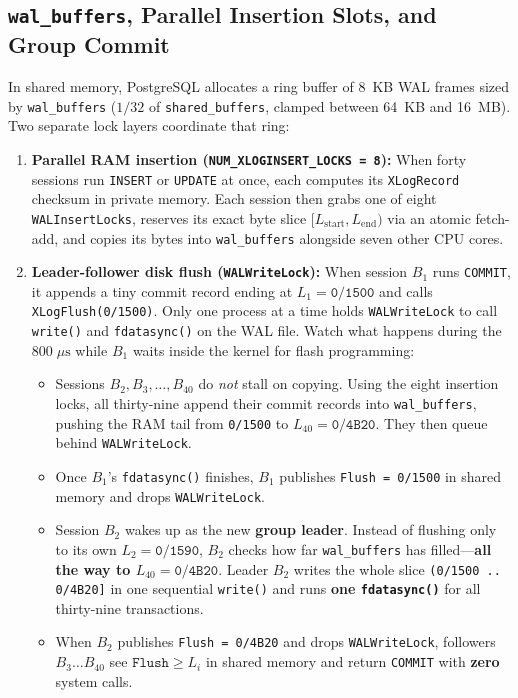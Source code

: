 \subsection{\texttt{wal\_buffers}, Parallel Insertion Slots, and Group Commit}

In shared memory, PostgreSQL allocates a ring buffer of 8~KB WAL frames sized by \texttt{wal\_buffers} ($1/32$ of \texttt{shared\_buffers}, clamped between 64~KB and 16~MB). Two separate lock layers coordinate that ring:

\begin{enumerate}
  \item \textbf{Parallel RAM insertion (\texttt{NUM\_XLOGINSERT\_LOCKS = 8}):} When forty sessions run \texttt{INSERT} or \texttt{UPDATE} at once, each computes its \texttt{XLogRecord} checksum in private memory. Each session then grabs one of eight \texttt{WALInsertLocks}, reserves its exact byte slice $[L_{\text{start}}, L_{\text{end}})$ via an atomic fetch-add, and copies its bytes into \texttt{wal\_buffers} alongside seven other CPU cores.
  \item \textbf{Leader-follower disk flush (\texttt{WALWriteLock}):} When session $B_1$ runs \texttt{COMMIT}, it appends a tiny commit record ending at $L_1 = \texttt{0/1500}$ and calls \texttt{XLogFlush(0/1500)}. Only one process at a time holds \texttt{WALWriteLock} to call \texttt{write()} and \texttt{fdatasync()} on the WAL file. Watch what happens during the $800\;\mu\text{s}$ while $B_1$ waits inside the kernel for flash programming:
    \begin{itemize}
      \item Sessions $B_2, B_3, \dots, B_{40}$ do \emph{not} stall on copying. Using the eight insertion locks, all thirty-nine append their commit records into \texttt{wal\_buffers}, pushing the RAM tail from \texttt{0/1500} to $L_{40} = \texttt{0/4B20}$. They then queue behind \texttt{WALWriteLock}.
      \item Once $B_1$'s \texttt{fdatasync()} finishes, $B_1$ publishes \texttt{Flush = 0/1500} in shared memory and drops \texttt{WALWriteLock}.
      \item Session $B_2$ wakes up as the new \textbf{group leader}. Instead of flushing only to its own $L_2 = \texttt{0/1590}$, $B_2$ checks how far \texttt{wal\_buffers} has filled---\textbf{all the way to $L_{40} = \texttt{0/4B20}$}. Leader $B_2$ writes the whole slice \texttt{(0/1500 .. 0/4B20]} in one sequential \texttt{write()} and runs \textbf{one \texttt{fdatasync()}} for all thirty-nine transactions.
      \item When $B_2$ publishes \texttt{Flush = 0/4B20} and drops \texttt{WALWriteLock}, followers $B_3 \dots B_{40}$ see $\texttt{Flush} \ge L_i$ in shared memory and return \texttt{COMMIT} with \textbf{zero} system calls.
    \end{itemize}
\end{enumerate}

